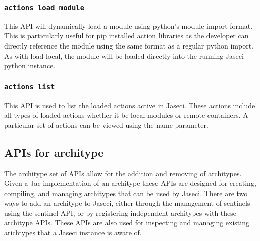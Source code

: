 \subsubsection{\lstinline[basicstyle=\Large\ttfamily]$actions load module$}

{This API will dynamically load a module using python's module import format.
This is particularly useful for pip installed action libraries as the developer
can directly reference the module using the same format as a regular python
import. As with load local, the module will be loaded directly into the running
Jaseci python instance.\vspace{4mm}\par
{}}
\subsubsection{\lstinline[basicstyle=\Large\ttfamily]$actions list$}

{This API is used to list the loaded actions active in Jaseci. These actions
include all types of loaded actions whether it be local modules or remote
containers. A particular set of actions can be viewed using the name parameter.\vspace{4mm}\par
{}}
\subsection{APIs for architype}

\par
The architype set of APIs allow for the addition and removing of
architypes. Given a Jac implementation of an architype these APIs are
designed for creating, compiling, and managing architypes that can be
used by Jaseci. There are two ways to add an architype to Jaseci, either
through the management of sentinels using the sentinel API, or by
registering independent architypes with these architype APIs. These
APIs are also used for inspecting and managing existing arichtypes that
a Jaseci instance is aware of.

